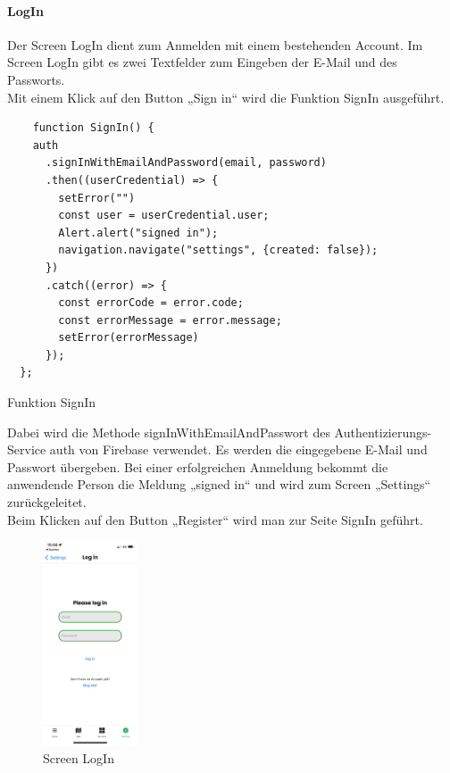 \paragraph{LogIn}Der Screen LogIn dient zum Anmelden mit einem bestehenden Account. Im Screen LogIn gibt es zwei Textfelder zum Eingeben der E-Mail und des Passworts. \\
Mit einem Klick auf den Button „Sign in“ wird die Funktion SignIn ausgeführt. \\
\begin{listing}[H]
  \begin{verbatim}
    function SignIn() {
    auth
      .signInWithEmailAndPassword(email, password)
      .then((userCredential) => {
        setError("")
        const user = userCredential.user;
        Alert.alert("signed in");
        navigation.navigate("settings", {created: false});
      })
      .catch((error) => {
        const errorCode = error.code;
        const errorMessage = error.message;
        setError(errorMessage)
      });
  };
\end{verbatim}
  \caption{Funktion SignIn}
  \label{lst:signin}
\end{listing}

Dabei wird die Methode signInWithEmailAndPasswort des Authentizierungs-Service auth von Firebase verwendet. Es werden die eingegebene E-Mail und Passwort übergeben. Bei einer erfolgreichen Anmeldung bekommt die anwendende Person die Meldung „signed in“ und wird zum Screen „Settings“ zurückgeleitet.\\
Beim Klicken auf den Button „Register“ wird man zur Seite SignIn geführt.\\
\begin{figure}[H]
  \centering
  \includegraphics[width=0.25\textwidth]{images/app-screenshots/screenlogin.png}
  \caption{Screen LogIn}
  \label{fig:login}
\end{figure}


